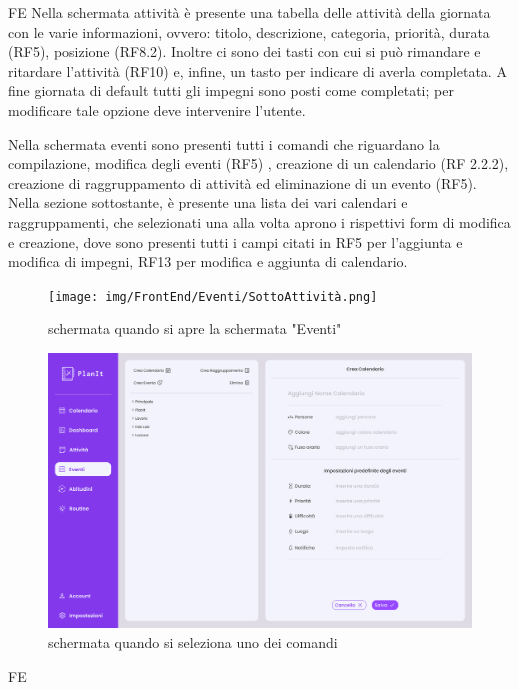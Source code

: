 \begin{listaPersonale}{FE}
     Nella schermata attività è presente una tabella delle attività della giornata con le varie informazioni, ovvero: titolo, descrizione, categoria, priorità, durata (RF5), posizione (RF8.2). Inoltre ci sono dei tasti con cui si può rimandare e ritardare l’attività (RF10) e, infine, un tasto per indicare di averla completata. A fine giornata di default tutti gli impegni sono posti come completati; per modificare tale opzione deve intervenire l’utente.
    
     Nella schermata eventi sono presenti tutti i comandi che riguardano la compilazione, modifica degli eventi (RF5) , creazione di un calendario (RF 2.2.2), creazione di raggruppamento di attività ed eliminazione di un evento (RF5).
    Nella sezione sottostante, è presente una lista dei vari calendari e raggruppamenti, che selezionati una alla volta aprono i rispettivi form di modifica e creazione, dove sono presenti tutti i campi citati in RF5 per l’aggiunta e modifica di impegni, RF13 per modifica e aggiunta di calendario. 
    \begin{figure}[H]
        \centering
        \texttt{[image: img/FrontEnd/Eventi/SottoAttività.png]}
        \caption{schermata quando si apre la schermata "Eventi"}
    \end{figure}
    \begin{figure}[h]
        \centering
        \includegraphics[width=1\textwidth]{img/FrontEnd/Eventi/Calendario/CreaCalendario.png}
        \caption{schermata quando si seleziona uno dei comandi}
    \end{figure}
    \begin{listaPersonale2}{FE}
        

\end{listaPersonale2}
\end{listaPersonale}
